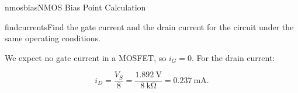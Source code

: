 \begin{mainquestion}{nmosbias}{NMOS Bias Point Calculation}
\begin{partquestion}{findcurrents}{Find the gate current and the drain current for the circuit under the same operating conditions.}
\begin{answer}
We expect no gate current in a MOSFET, so $i_{G} = 0$. For the drain current:

\[
i_{D} = \frac{V_{S}}{8} = \frac{\qty{1.892}{\volt}}{\qty{8}{\kilo\ohm}} = \qty{0.237}{\milli\ampere}.
\]
\end{answer}
\end{partquestion}

\end{mainquestion}
